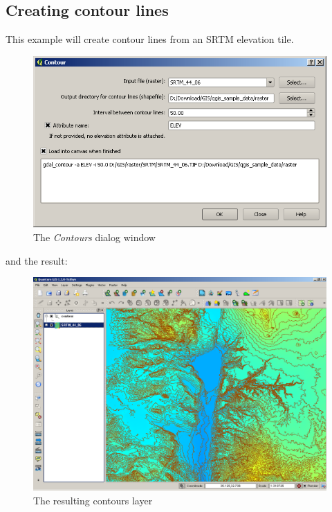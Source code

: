 {\subsection{Creating contour lines}
This example will create contour lines from an SRTM elevation tile.
\begin{figure}[ht]
   \centering
   \caption{\label{gdal_contour} The \emph{Contours} dialog window \nixcaption}
   \includegraphics[clip=true, width=12cm]{plugins_gdaltools_images/gdal_contour}
\end{figure}
and the result:
\begin{figure}[ht]
   \centering
   \caption{\label{gdal_contour} The resulting contours layer \nixcaption}
   \includegraphics[clip=true, width=12cm]{plugins_gdaltools_images/qgis_contours}
\end{figure}

}

